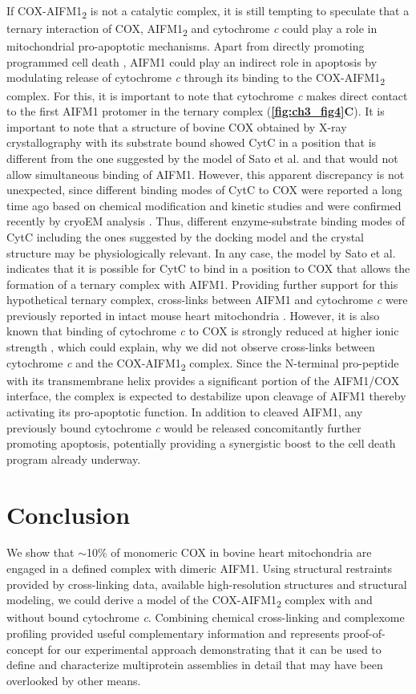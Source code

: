 If COX-AIFM1\textsubscript{2} is not a catalytic complex, it is still tempting to speculate that a ternary interaction of COX, AIFM1\textsubscript{2} and cytochrome \emph{c} could play a role in mitochondrial pro-apoptotic mechanisms. Apart from directly promoting programmed cell death \cite{RN55, RN56, RN5}, AIFM1 could play an indirect role in apoptosis by modulating release of cytochrome \emph{c} \cite{RN1} through its binding to the COX-AIFM1\textsubscript{2} complex. For this, it is important to note that cytochrome \emph{c} makes direct contact to the first AIFM1 protomer in the ternary complex (\textbf{\autoref{fig:ch3_fig4}C}). It is important to note that a structure of bovine COX obtained by X-ray crystallography with its substrate bound \cite{RN57} showed CytC in a position that is different from the one suggested by the model of Sato et al. \cite{RN54} and that would not allow simultaneous binding of AIFM1. However, this apparent discrepancy is not unexpected, since different binding modes of CytC to COX were reported a long time ago based on chemical modification and kinetic studies \cite{RN58} and were confirmed recently by cryoEM analysis \cite{RN59}. Thus, different enzyme-substrate binding modes of CytC including the ones suggested by the docking model and the crystal structure may be physiologically relevant. In any case, the model by Sato et al. \cite{RN54} indicates that it is possible for CytC to bind in a position to COX that allows the formation of a ternary complex with AIFM1. Providing further support for this hypothetical ternary complex, cross-links between AIFM1 and cytochrome \emph{c} were previously reported in intact mouse heart mitochondria \cite{RN16}. However, it is also known that binding of cytochrome \emph{c} to COX is strongly reduced at higher ionic strength \cite{RN60}, which could explain, why we did not observe cross-links between cytochrome \emph{c} and the COX-AIFM1\textsubscript{2} complex. Since the N-terminal pro-peptide with its transmembrane helix provides a significant portion of the AIFM1/COX interface, the complex is expected to destabilize upon cleavage of AIFM1 thereby activating its pro-apoptotic function. In addition to cleaved AIFM1, any previously bound cytochrome \emph{c} would be released concomitantly further promoting apoptosis, potentially providing a synergistic boost to the cell death program already underway.
%
\section{Conclusion}
We show that $\sim$10\% of monomeric COX in bovine heart mitochondria are engaged in a defined complex with dimeric AIFM1. Using structural restraints provided by cross-linking data, available high-resolution structures and structural modeling, we could derive a model of the COX-AIFM1\textsubscript{2}  complex with and without bound cytochrome \emph{c}. Combining chemical cross-linking and complexome profiling provided useful complementary information and represents proof-of-concept for our experimental approach demonstrating that it can be used to define and characterize multiprotein assemblies in detail that may have been overlooked by other means.

